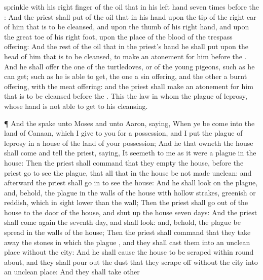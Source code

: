 {sprinkle with his
right
finger
{} of the
oil that
{} in his
left
hand
seven
times
before the
{}:
And the
priest shall
put of the
oil that
{} in his
hand upon the
tip of the
right
ear of him that is to be
cleansed, and upon the
thumb of his
right
hand, and upon the great
toe of his
right
foot, upon the
place of the
blood of the trespass
offering:
And the
rest of the
oil that
{} in the
priest’s
hand he shall
put upon the
head of him that is to be
cleansed, to make an
atonement for him
before the
{}.
And he shall
offer the
one of the
turtledoves, or of the
young
pigeons, such
as he can
get;
 such as
he is able to
get, the
one
{} a sin
offering, and the
other
{} a burnt
offering, with the meat
offering: and the
priest shall make an
atonement for him that is to be
cleansed
before the
{}.
This
{} the
law
{} in whom
{} the
plague of
leprosy, whose
hand is not able to
get
{} to his
cleansing.
\par }{\PP {}¶ And the
{}
spake unto
Moses and unto
Aaron,
saying,
When ye be
come into the
land of
Canaan, which I
give to you for a
possession, and I
put the
plague of
leprosy in a
house of the
land of your
possession;
And he that owneth the
house shall
come and
tell the
priest,
saying, It
seemeth to me
{} as it were a
plague in the
house:
Then the
priest shall
command that they
empty the
house, before the
priest
go
{} to
see the
plague, that all that
{} in the
house be not made
unclean: and
afterward the
priest shall
go in to
see the
house:
And he shall
look on the
plague, and, behold,
{} the
plague
{} in the
walls of the
house with hollow
strakes,
greenish or
reddish, which in
sight
{}
lower
than the
wall;
Then the
priest shall
go out of the
house to the
door of the
house, and
shut up the
house
seven
days:
And the
priest shall come
again the
seventh
day, and shall
look: and, behold,
{} the
plague be
spread in the
walls of the
house;
Then the
priest shall
command that they
take away the
stones in
which the
plague
{}, and they shall
cast them into an
unclean
place
without the
city:
And he shall cause the
house to be
scraped
within round
about, and they shall
pour out the
dust that they
scrape off
without the
city into an
unclean
place:
And they shall
take
other
}
